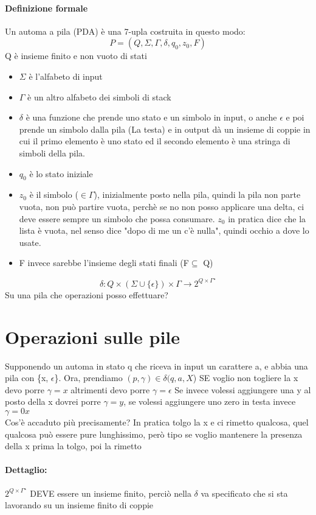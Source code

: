 \documentclass[12pt, a4paper, openany, oneside]{book}
\begin{document}
\paragraph{Definizione formale} Un automa a pila (PDA) è una 7-upla costruita
in questo modo:
\[
P = (Q, \Sigma, \Gamma, \delta, q_{0}, z_{0}, F)
\]	
Q è insieme finito e non vuoto di stati\\
\begin{itemize}
	\item $\Sigma$ è l'alfabeto di input
	\item $\Gamma$ è un altro alfabeto dei simboli di stack 
	\item $\delta$ è una funzione che prende uno stato e un simbolo in input, o anche $\epsilon$
	e poi prende un simbolo dalla pila (La testa) e in output dà un insieme di 
	coppie in cui il primo elemento è uno stato ed il secondo elemento è una stringa
	di simboli della pila. 
	\item $q_{0}$ è lo stato iniziale
	\item $z_{0}$ è il simbolo ($\in \Gamma$), inizialmente posto nella pila, quindi la pila
	non parte vuota, non può partire vuota, perchè se no non posso applicare una
	delta, ci deve essere sempre un simbolo che possa consumare. $z_{0}$ in pratica 
	dice che la lista è vuota, nel senso dice "dopo di me un c'è nulla", quindi 
	occhio a dove lo usate.
	\item F invece sarebbe l'insieme degli stati finali (F$\subseteq$ Q)
\end{itemize}
\[
\delta : Q \times (\Sigma \cup \{\epsilon\}) \times \Gamma \to 2^{Q\times 
\Gamma^{\star}}
\]	
Su una pila che operazioni posso effettuare?
\section{Operazioni sulle pile}
Supponendo un automa in stato q che riceva in input un carattere a, e abbia una
pila con \{x, $\epsilon$\}. Ora, prendiamo $(p, \gamma) \in \delta(q, a, X$) SE
voglio non togliere la x devo porre $\gamma = x$ altrimenti devo porre $\gamma = \epsilon$
Se invece volessi aggiungere una y al posto della x dovrei porre $\gamma = y$,
se volessi aggiungere uno zero in testa invece $\gamma = 0x$\\
Cos'è accaduto più precisamente? In pratica tolgo la x e ci rimetto qualcosa,
quel qualcosa può essere pure lunghissimo, però tipo se voglio mantenere la
presenza della x prima la tolgo, poi la rimetto
\paragraph{Dettaglio: }$2^{Q \times \Gamma^{\star}}$ DEVE essere un insieme 
finito, perciò nella $\delta$ va specificato che si sta lavorando su un insieme
finito di coppie
\end{document}
